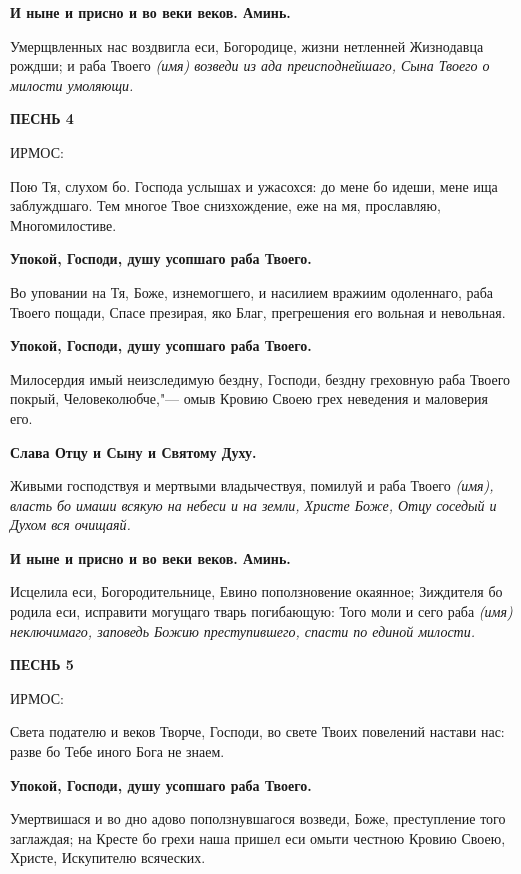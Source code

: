 \bfseries И ныне и присно и во веки веков. Аминь.\normalfont{}\normalfont{}


Умерщвленных нас воздвигла еси, Богородице, жизни нетленней Жизнодавца рождши; и раба Твоего \itshape (имя)\normalfont{} возведи из ада преисподнейшаго, Сына Твоего о милости умоляющи. 


\bfseries ПЕСНЬ 4


ИРМОС:\normalfont{}


Пою Тя, слухом бо. Господа услышах и ужасохся: до мене бо идеши, мене ища заблуждшаго. Тем многое Твое снизхождение, еже на мя, прославляю, Многомилостиве.


\bfseries Упокой, Господи, душу усопшаго раба Твоего.\normalfont{}\normalfont{}


Во уповании на Тя, Боже, изнемогшего, и насилием вражиим одоленнаго, раба Твоего пощади, Спасе презирая, яко Благ, прегрешения его вольная и невольная.


\bfseries Упокой, Господи, душу усопшаго раба Твоего.\normalfont{}\normalfont{}


Милосердия имый неизследимую бездну, Господи, бездну греховную раба Твоего покрый, Человеколюбче,"--- омыв Кровию Своею грех неведения и маловерия его.


\bfseries Слава Отцу и Сыну и Святому Духу.\normalfont{}\normalfont{}


Живыми господствуя и мертвыми владычествуя, помилуй и раба Твоего \itshape (имя)\normalfont{}, власть бо имаши всякую на небеси и на земли, Христе Боже, Отцу соседый и Духом вся очищаяй.


\bfseries И ныне и присно и во веки веков. Аминь.\normalfont{}\normalfont{}


Исцелила еси, Богородительнице, Евино поползновение окаянное; Зиждителя бо родила еси, исправити могущаго тварь погибающую: Того моли и сего раба \itshape (имя)\normalfont{} неключимаго, заповедь Божию преступившего, спасти по единой милости. 


\bfseries ПЕСНЬ 5


ИРМОС:\normalfont{}


Света подателю и веков Творче, Господи, во свете Твоих повелений настави нас: разве бо Тебе иного Бога не знаем.


\bfseries Упокой, Господи, душу усопшаго раба Твоего.\normalfont{}\normalfont{}


Умертвишася и во дно адово поползнувшагося возведи, Боже, преступление того заглаждая; на Кресте бо грехи наша пришел еси омыти честною Кровию Своею, Христе, Искупителю всяческих.


